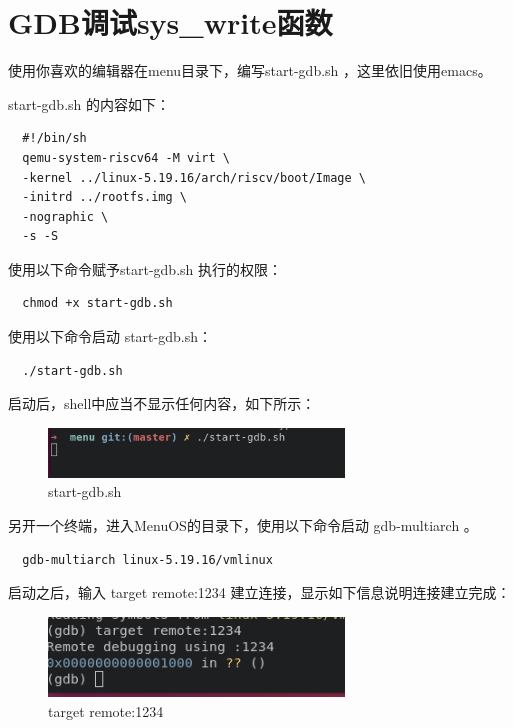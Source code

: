 \documentclass[lang=cn,10pt]{elegantbook}
\begin{document}
\section{GDB调试sys\_write函数}
使用你喜欢的编辑器在menu目录下，编写start-gdb.sh ，这里依旧使用emacs。

start-gdb.sh 的内容如下：

\begin{lstlisting}
  #!/bin/sh
  qemu-system-riscv64 -M virt \
  -kernel ../linux-5.19.16/arch/riscv/boot/Image \
  -initrd ../rootfs.img \
  -nographic \
  -s -S
\end{lstlisting}

使用以下命令赋予start-gdb.sh 执行的权限：

\begin{lstlisting}
  chmod +x start-gdb.sh
\end{lstlisting}
使用以下命令启动 start-gdb.sh：

\begin{lstlisting}
  ./start-gdb.sh
\end{lstlisting}
启动后，shell中应当不显示任何内容，如下所示：
\begin{figure}[htbp]
  \centering
  \includegraphics[width=0.7\textwidth]{image/image-20231105221503598.png}
  \caption{start-gdb.sh}
\end{figure}

另开一个终端，进入MenuOS的目录下，使用以下命令启动 gdb-multiarch  。
\begin{lstlisting}
  gdb-multiarch linux-5.19.16/vmlinux
\end{lstlisting}
启动之后，输入 target remote:1234 建立连接，显示如下信息说明连接建立完成：
\begin{figure}[htbp]
  \centering
  \includegraphics[width=0.7\textwidth]{image/image-20231105221724247.png}
  \caption{target remote:1234}
\end{figure}
\end{document}
